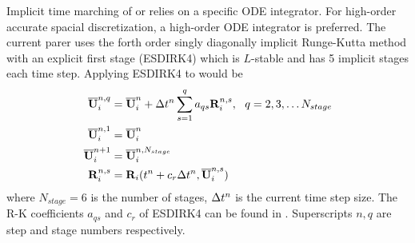 Implicit time marching of  or 
relies on a specific ODE integrator.
For high-order accurate spacial discretization,
a high-order ODE integrator is preferred.
The current parer uses the forth order
singly diagonally implicit Runge-Kutta method with an
explicit first stage (ESDIRK4) \cite{kvaerno2004singly}
which is $L$-stable and has 5 implicit stages each time step.
Applying ESDIRK4 to  would be
\begin{equation}
    \begin{aligned}
        \overline{\mathbf{U}}^{n,q}_i & = \overline{\mathbf{U}}^{n}_i + \mathrm\Delta t^n \sum_{s=1}^q a_{qs} \mathbf{R}^{n,s}_i,\ \ q = 2,3,\dots N_{stage} \\
        \overline{\mathbf{U}}^{n,1}_i & = \overline{\mathbf{U}}^{n}_i                                                               \\
        \overline{\mathbf{U}}^{n+1}_i & = \overline{\mathbf{U}}^{n,N_{stage}}_i                                                             \\
        \mathbf{R}^{n,s}_i  & = \mathbf{R}_i(t^n + c_r \mathrm\Delta t^n, \overline{\mathbf{U}}^{n,s}_i)
    \end{aligned}
\end{equation}
where $N_{stage}=6$ is the number of stages,  $\mathrm\Delta t^n$ is the current
time step size.
The R-K coefficients $a_{qs}$ and $c_r$ of ESDIRK4 can be found
in \cite{kvaerno2004singly}.
Superscripts $n, q$ are step and stage numbers
respectively.


